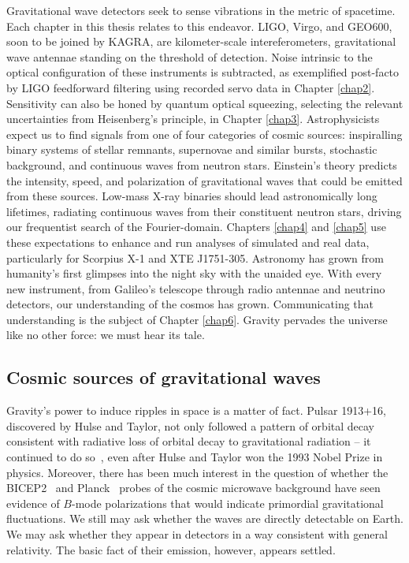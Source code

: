 Gravitational wave detectors seek to sense vibrations in the metric of spacetime.
Each chapter in this thesis relates to this endeavor.
LIGO, Virgo, and GEO600, soon to be joined by KAGRA, are kilometer-scale intereferometers, gravitational wave antennae standing on the threshold of detection.
Noise intrinsic to the optical configuration of these instruments is subtracted, as exemplified post-facto by LIGO feedforward filtering using recorded servo data in Chapter \ref{chap2}. 
Sensitivity can also be honed by quantum optical squeezing, selecting the relevant uncertainties from Heisenberg's principle, in Chapter \ref{chap3}.
Astrophysicists expect us to find signals from one of four categories of cosmic sources: inspiralling binary systems of stellar remnants, supernovae and similar bursts, stochastic background, and continuous waves from neutron stars.
Einstein's theory predicts the intensity, speed, and polarization of gravitational waves that could be emitted from these sources.
Low-mass X-ray binaries should lead astronomically long lifetimes, radiating continuous waves from their constituent neutron stars, driving our frequentist search of the Fourier-domain.
Chapters \ref{chap4} and \ref{chap5} use these expectations to enhance and run analyses of simulated and real data, particularly for Scorpius X-1 and XTE J1751-305.
Astronomy has grown from humanity's first glimpses into the night sky with the unaided eye. 
With every new instrument, from Galileo's telescope through radio antennae and neutrino detectors, our understanding of the cosmos has grown. 
Communicating that understanding is the subject of Chapter \ref{chap6}.
Gravity pervades the universe like no other force: we must hear its tale. 

        
        \subsection{Cosmic sources of gravitational waves}
        \label{cosmic_sources}
      

		Gravity's power to induce ripples in space is a matter of fact. Pulsar 1913+16, discovered by Hulse and Taylor, not only followed a pattern of orbital decay consistent with radiative loss of orbital decay to gravitational radiation -- it continued to do so~\cite{WeisbergTaylor2004,Weisberg2010}, even after Hulse and Taylor won the 1993 Nobel Prize in physics. 
Moreover, there has been much interest in the question of whether the BICEP2~\cite{BICEP2014} and Planck~\cite{Planck2014} probes of the cosmic microwave background have seen evidence of $B$-mode polarizations that would indicate primordial gravitational fluctuations. We still may ask whether the waves are directly detectable on Earth. We may ask whether they appear in detectors in a way consistent with general relativity. The basic fact of their emission, however, appears settled.

